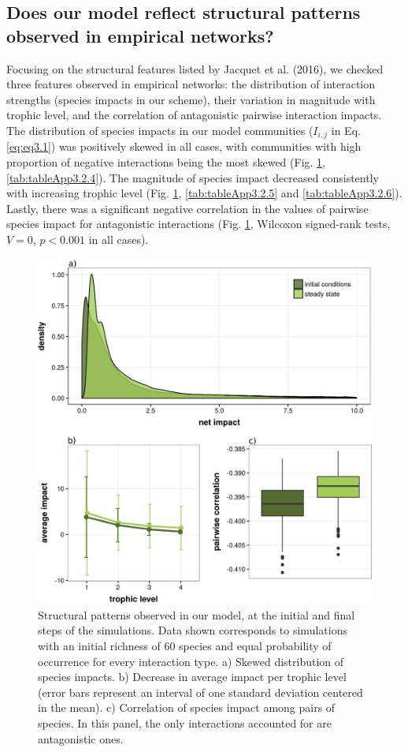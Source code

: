\FloatBarrier

\subsection*{Does our model reflect structural patterns observed in empirical networks?}

Focusing on the structural features listed by Jacquet et al. (2016), we checked three features observed in empirical networks: the distribution of interaction strengths (species impacts in our scheme), their variation in magnitude with trophic level, and the correlation of antagonistic pairwise interaction impacts. The distribution of species impacts in our model communities ($I_{i,j}$ in Eq. \ref{eq:eq3.1}) was positively skewed in all cases, with communities with high proportion of negative interactions being the most skewed (Fig. \ref{fig:fig3.4}, \cref{tab:tableApp3.2.4}). The magnitude of species impact decreased consistently with increasing trophic level (Fig. \ref{fig:fig3.4}, \cref{tab:tableApp3.2.5} and \cref{tab:tableApp3.2.6}). Lastly, there was a significant negative correlation in the values of pairwise species impact for antagonistic interactions (Fig. \ref{fig:fig3.4}, Wilcoxon signed-rank tests, $V = 0$, $p < 0.001$ in all cases).

\begin{figure}[!ht]
\centering
\includegraphics[width=.7\textwidth]{./Figures/chapter03/Fig_4.png}
\caption[Community structural patterns]{\color{Gray} Structural patterns observed in our model, at the initial and final steps of the simulations. Data shown corresponds to simulations with an initial richness of 60 species and equal probability of occurrence for every interaction type. a) Skewed distribution of species impacts. b) Decrease in average impact per trophic level (error bars represent an interval of one standard deviation centered in the mean). c) Correlation of species impact among pairs of species. In this panel, the only interactions accounted for are antagonistic ones.}
\label{fig:fig3.4}
\end{figure}

